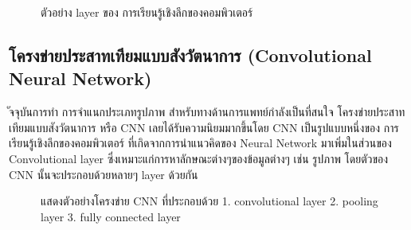 \documentclass[12pt,oneside,openright,a4paper]{cpe-thai-project}
\begin{document}
\begin{figure}[!ht]\centering
  \setlength{\fboxrule}{0.2mm} %
  \setlength{\fboxsep}{1cm}
  \caption{ตัวอย่าง layer ของ การเรียนรู้เชิงลึกของคอมพิวเตอร์}\label{fig:deep}
\end{figure}

\subsection{โครงข่ายประสาทเทียมแบบสังวัตนาการ (Convolutional Neural Network)}
ัจจุบันการทำ การจำแนกประเภทรูปภาพ สำหรับทางด้านการแพทย์กำลังเป็นที่สนใจ โครงข่ายประสาทเทียมแบบสังวัตนาการ 
หรือ CNN เลยได้รับความนิยมมากขึ้นโดย CNN เป็นรูปแบบหนึ่งของ การเรียนรู้เชิงลึกของคอมพิวเตอร์ ที่เกิดจากการนำแนวคิดของ  
Neural Network มาเพิ่มในส่วนของ Convolutional layer ซึ่งเหมาะแก่การหาลักษณะต่างๆของข้อมูลต่างๆ เช่น รูปภาพ 
โดยตัวของ CNN นั้นจะประกอบด้วยหลายๆ layer ด้วยกัน

\begin{figure}[!ht]\centering
  \setlength{\fboxrule}{0.2mm} %
  \setlength{\fboxsep}{1cm}
  \caption{แสดงตัวอย่างโครงข่าย CNN ที่ประกอบด้วย 1. convolutional layer 2. pooling layer 3. fully connected layer
  }\label{fig:cnn}
\end{figure}
\end{document}
